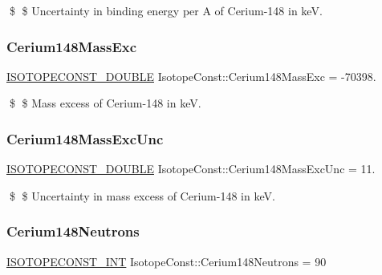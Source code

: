 \$ \$ Uncertainty in binding energy per A of Cerium-\/148 in keV. \mbox{\label{group___isotope_const-_cerium-_ce148_ga87c3184e8636ca225af37f1b596f464e}} 
\subsubsection{\texorpdfstring{Cerium148\+Mass\+Exc}{Cerium148MassExc}}
{\footnotesize\ttfamily \mbox{\hyperlink{group___isotope_const-_macros_ga8f45a7272ce02c0b4c65c44636ed719a}{I\+S\+O\+T\+O\+P\+E\+C\+O\+N\+S\+T\+\_\+\+D\+O\+U\+B\+LE}} Isotope\+Const\+::\+Cerium148\+Mass\+Exc = -\/70398.}

\$ \$ Mass excess of Cerium-\/148 in keV. \mbox{\label{group___isotope_const-_cerium-_ce148_ga1db3fbcb5e5bb27dfe509005ec6cbbdf}} 
\subsubsection{\texorpdfstring{Cerium148\+Mass\+Exc\+Unc}{Cerium148MassExcUnc}}
{\footnotesize\ttfamily \mbox{\hyperlink{group___isotope_const-_macros_ga8f45a7272ce02c0b4c65c44636ed719a}{I\+S\+O\+T\+O\+P\+E\+C\+O\+N\+S\+T\+\_\+\+D\+O\+U\+B\+LE}} Isotope\+Const\+::\+Cerium148\+Mass\+Exc\+Unc = 11.}

\$ \$ Uncertainty in mass excess of Cerium-\/148 in keV. \mbox{\label{group___isotope_const-_cerium-_ce148_gadc0bebd1d44196413166442ee4686307}} 
\subsubsection{\texorpdfstring{Cerium148\+Neutrons}{Cerium148Neutrons}}
{\footnotesize\ttfamily \mbox{\hyperlink{group___isotope_const-_macros_ga5f18360b3e99483a35c32d789e62621c}{I\+S\+O\+T\+O\+P\+E\+C\+O\+N\+S\+T\+\_\+\+I\+NT}} Isotope\+Const\+::\+Cerium148\+Neutrons = 90}

